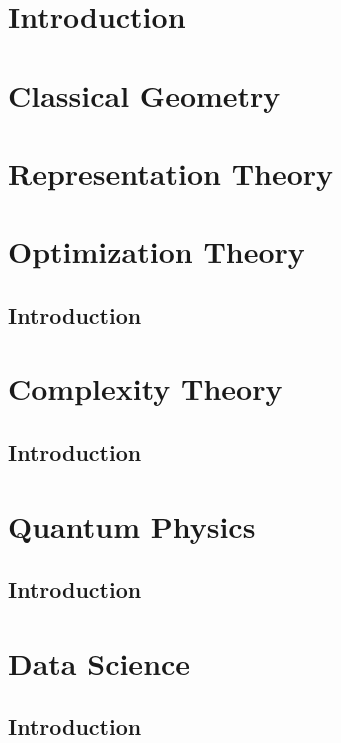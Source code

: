 \documentclass[oneside]{book}
\theoremstyle{plain}
\theoremstyle{definition}
\numberwithin{equation}{subsection}
\begin{document}
\part{Introduction}
\label{part-introduction}


\part{Classical Geometry}
\label{part-classicalAG}


\part{Representation Theory}
\label{part-RepTheory}


\part{Optimization Theory}
\label{part-optimization}

\chapter{Introduction}
\label{optimization-chapter-intro}

\part{Complexity Theory}
\label{part-complexitytheory}

\chapter{Introduction}
\label{complexitytheory-chapter-intro}

\part{Quantum Physics}
\label{part-quantumph}

\chapter{Introduction}
\label{quantumph-chapter-intro}

\part{Data Science}
\label{part-datascience}

\chapter{Introduction}
\label{datascience-chapter-intro}



\end{document}
